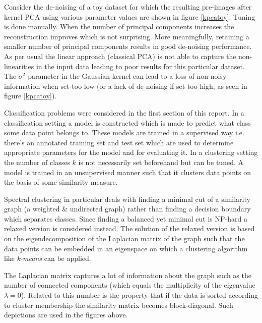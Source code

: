\par Consider the de-noising of a toy dataset for which the resulting pre-images after kernel PCA using various parameter values are shown in figure \ref{kpcatoy}. Tuning is done manually. When the number of principal components increases the reconstruction improves which is not surprising. More meaningfully, retaining a smaller number of principal components results in good de-noising performance. As per usual the linear approach (classical PCA) is not able to capture the non-linearities in the input data leading to poor results for this particular dataset. The $\sigma^2$ parameter in the Gaussian kernel can lead to a loss of non-noisy information when set too low (or a lack of de-noising if set too high, as seen in figure \ref{kpcatoy}).


Classification problems were considered in the first section of this report. In a classification setting a model is constructed which is made to predict what class some data point belongs to. These models are trained in a supervised way i.e. there's an annotated training set and test set which are used to determine appropriate parameters for the model and for evaluating it. In a clustering setting the number of classes $k$ is not necessarily set beforehand but can be tuned. A model is trained in an unsupervised manner such that it clusters data points on the basis of some similarity measure. 

\par Spectral clustering in particular deals with finding a minimal cut of a similarity graph (a weighted \& undirected graph) rather than finding a decision boundary which separates classes. Since finding a balanced yet minimal cut is NP-hard a relaxed version is considered instead. The solution of the relaxed version is based on the eigendecomposition of the Laplacian matrix of the graph such that the data points can be embedded in an eigenspace on which a clustering algorithm like \textit{k-means} can be applied. 

\par The Laplacian matrix captures a lot of information about the graph such as the number of connected components (which equals the multiplicity of the eigenvalue $\lambda=0$). Related to this number is the property that if the data is sorted according to cluster membership the similarity matrix becomes block-diagonal. Such depictions are used in the figures above. 

